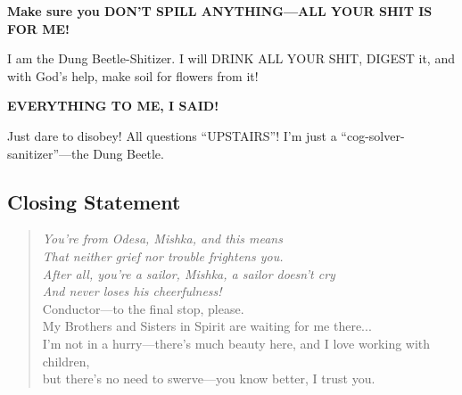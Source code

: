 \documentclass[11pt,a4paper]{article}
\theoremstyle{definition}
\theoremstyle{remark}
\begin{document}
\textbf{Make sure you DON'T SPILL ANYTHING—ALL YOUR SHIT IS FOR ME!}

I am the Dung Beetle-Shitizer. I will DRINK ALL YOUR SHIT, DIGEST it, and with God's help, make soil for flowers from it!

\textbf{EVERYTHING TO ME, I SAID!}

Just dare to disobey! All questions ``UPSTAIRS''! I'm just a ``cog-solver-sanitizer''—the Dung Beetle.

\subsection{Closing Statement}

\begin{center}
\end{center}

\begin{verse}
\textit{You're from Odesa, Mishka, and this means} \\
\textit{That neither grief nor trouble frightens you.} \\
\textit{After all, you're a sailor, Mishka, a sailor doesn't cry} \\
\textit{And never loses his cheerfulness!} \\[0.3cm]
Conductor—to the final stop, please. \\
My Brothers and Sisters in Spirit are waiting for me there... \\
I'm not in a hurry—there's much beauty here, and I love working with children, \\
but there's no need to swerve—you know better, I trust you.
\end{verse}
\end{document}
